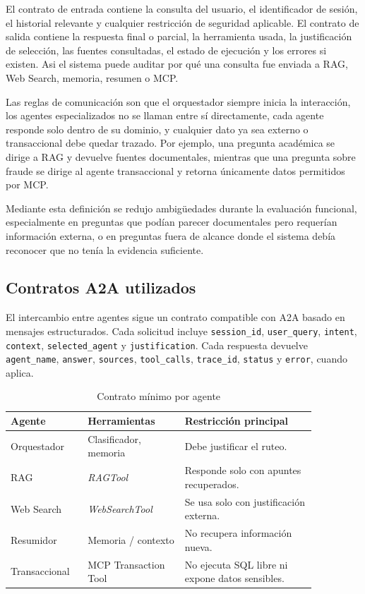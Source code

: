 \documentclass[conference]{IEEEtran}
\begin{document}
El contrato de entrada contiene la consulta del usuario, el identificador de sesión, el historial relevante y cualquier restricción de seguridad aplicable. El contrato de salida contiene la respuesta final o parcial, la herramienta usada, la justificación de selección, las fuentes consultadas, el estado de ejecución y los errores si existen. Asi el sistema puede auditar por qué una consulta fue enviada a RAG, Web Search, memoria, resumen o MCP.

Las reglas de comunicación son que el orquestador siempre inicia la interacción, los agentes especializados no se llaman entre sí directamente, cada agente responde solo dentro de su dominio, y cualquier dato ya sea externo o transaccional debe quedar trazado. Por ejemplo, una pregunta académica se dirige a RAG y devuelve fuentes documentales, mientras que una pregunta sobre fraude se dirige al agente transaccional y retorna únicamente datos permitidos por MCP.

Mediante esta definición se redujo ambigüedades durante la evaluación funcional, especialmente en preguntas que podían parecer documentales pero requerían información externa, o en preguntas fuera de alcance donde el sistema debía reconocer que no tenía la evidencia suficiente.

\subsection{Contratos A2A utilizados}

El intercambio entre agentes sigue un contrato compatible con A2A basado en mensajes estructurados. Cada solicitud incluye \texttt{session\_id}, \texttt{user\_query}, \texttt{intent}, \texttt{context}, \texttt{selected\_agent} y \texttt{justification}. Cada respuesta devuelve \texttt{agent\_name}, \texttt{answer}, \texttt{sources}, \texttt{tool\_calls}, \texttt{trace\_id}, \texttt{status} y \texttt{error}, cuando aplica.

\begin{table}[!t]
\caption{Contrato mínimo por agente}
\label{tab:contratos-a2a}
\centering
\begin{tabular}{p{0.20\linewidth} p{0.28\linewidth} p{0.38\linewidth}}
\hline
\textbf{Agente} & \textbf{Herramientas} & \textbf{Restricción principal} \\
\hline
Orquestador & Clasificador, memoria & Debe justificar el ruteo. \\
RAG & \textit{RAGTool} & Responde solo con apuntes recuperados. \\
Web Search & \textit{WebSearchTool} & Se usa solo con justificación externa. \\
Resumidor & Memoria / contexto & No recupera información nueva. \\
Transaccional & MCP Transaction Tool & No ejecuta SQL libre ni expone datos sensibles. \\
\hline
\end{tabular}
\end{table}
\end{document}
